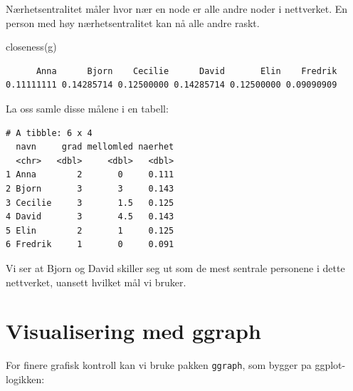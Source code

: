 \documentclass[
  norsk,
  letterpaper,
  DIV=11,
  numbers=noendperiod]{scrreprt}
\newenvironment{Shaded}{\begin{snugshade}}{\end{snugshade}}
\newcommand{\AttributeTok}[1]{\textcolor[rgb]{0.40,0.45,0.13}{#1}}
\newcommand{\DecValTok}[1]{\textcolor[rgb]{0.68,0.00,0.00}{#1}}
\newcommand{\FunctionTok}[1]{\textcolor[rgb]{0.28,0.35,0.67}{#1}}
\newcommand{\NormalTok}[1]{\textcolor[rgb]{0.00,0.23,0.31}{#1}}
\newcommand{\OtherTok}[1]{\textcolor[rgb]{0.00,0.23,0.31}{#1}}
\newcommand{\SpecialCharTok}[1]{\textcolor[rgb]{0.37,0.37,0.37}{#1}}
\theoremstyle{definition}
\theoremstyle{remark}
\begin{document}
Nærhetsentralitet måler hvor nær en node er alle andre noder i
nettverket. En person med høy nærhetsentralitet kan nå alle andre raskt.

\begin{Shaded}
\begin{Highlighting}[]
\FunctionTok{closeness}\NormalTok{(g)}
\end{Highlighting}
\end{Shaded}

\begin{verbatim}
      Anna      Bjorn    Cecilie      David       Elin    Fredrik 
0.11111111 0.14285714 0.12500000 0.14285714 0.12500000 0.09090909 
\end{verbatim}

La oss samle disse målene i en tabell:

\begin{Shaded}
\end{Shaded}

\begin{verbatim}
# A tibble: 6 x 4
  navn     grad mellomled naerhet
  <chr>   <dbl>     <dbl>   <dbl>
1 Anna        2       0     0.111
2 Bjorn       3       3     0.143
3 Cecilie     3       1.5   0.125
4 David       3       4.5   0.143
5 Elin        2       1     0.125
6 Fredrik     1       0     0.091
\end{verbatim}

Vi ser at Bjorn og David skiller seg ut som de mest sentrale personene i
dette nettverket, uansett hvilket mål vi bruker.

\section{Visualisering med ggraph}\label{visualisering-med-ggraph}

For finere grafisk kontroll kan vi bruke pakken \texttt{ggraph}, som
bygger pa ggplot-logikken:
\end{document}
